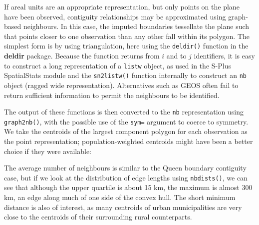 \documentclass[]{book}
\newenvironment{Shaded}{\begin{snugshade}}{\end{snugshade}}
\newcommand{\CommentTok}[1]{\textcolor[rgb]{0.56,0.35,0.01}{\textit{#1}}}
\newcommand{\DataTypeTok}[1]{\textcolor[rgb]{0.13,0.29,0.53}{#1}}
\newcommand{\KeywordTok}[1]{\textcolor[rgb]{0.13,0.29,0.53}{\textbf{#1}}}
\newcommand{\NormalTok}[1]{#1}
\newcommand{\OperatorTok}[1]{\textcolor[rgb]{0.81,0.36,0.00}{\textbf{#1}}}
\newcommand{\OtherTok}[1]{\textcolor[rgb]{0.56,0.35,0.01}{#1}}
\newcommand{\StringTok}[1]{\textcolor[rgb]{0.31,0.60,0.02}{#1}}
\begin{document}
If areal units are an appropriate representation, but only points on the plane have been observed, contiguity relationships may be approximated using graph-based neighbours. In this case, the imputed boundaries tessellate the plane such that points closer to one observation than any other fall within its polygon. The simplest form is by using triangulation, here using the \texttt{deldir()} function in the \textbf{deldir} package. Because the function returns from \(i\) and to \(j\) identifiers, it is easy to construct a long representation of a \texttt{listw} object, as used in the S-Plus SpatialStats module and the \texttt{sn2listw()} function internally to construct an \texttt{nb} object (ragged wide representation). Alternatives such as GEOS often fail to return sufficient information to permit the neighbours to be identified.

The output of these functions is then converted to the \texttt{nb} representation using \texttt{graph2nb()}, with the possible use of the \texttt{sym=} argument to coerce to symmetry. We take the centroids of the largest component polygon for each observation as the point representation; population-weighted centroids might have been a better choice if they were available:

\begin{Shaded}
\end{Shaded}

The average number of neighbours is similar to the Queen boundary contiguity case, but if we look at the distribution of edge lengths using \texttt{nbdists()}, we can see that although the upper quartile is about 15 km, the maximum is almost 300 km, an edge along much of one side of the convex hull. The short minimum distance is also of interest, as many centroids of urban municipalities are very close to the centroids of their surrounding rural counterparts.
\end{document}
